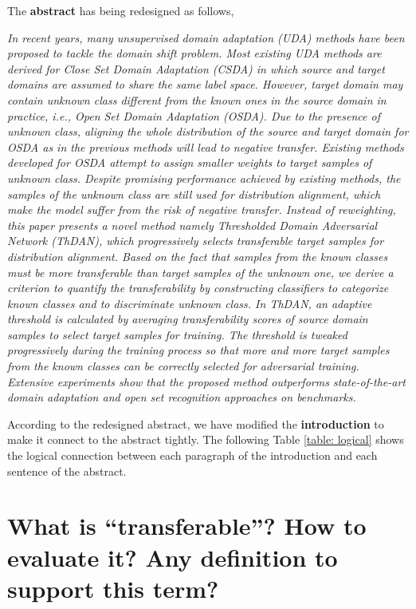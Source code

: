The \textbf{abstract} has being redesigned as follows,
\begin{siderules}
    \textit{
        \footnotesize
        In recent years, many unsupervised domain adaptation (UDA) methods have been proposed to tackle the domain shift problem.
        Most existing UDA methods are derived for Close Set Domain Adaptation (\textit{CSDA}) in which source and target domains are assumed to share the same label space.
        However, target domain may contain unknown class different from the known ones in the source domain in practice, i.e., Open Set Domain Adaptation (\textit{OSDA}).
        Due to the presence of unknown class, aligning the whole distribution of the source and target domain for OSDA as in the previous methods will lead to negative transfer.
        Existing methods developed for OSDA attempt to assign smaller weights to target samples of unknown class.
        Despite promising performance achieved by existing methods, the samples of the unknown class are still used for distribution alignment, which make the model suffer from the risk of negative transfer.
        Instead of reweighting, this paper presents a novel method namely Thresholded Domain Adversarial Network (\textit{ThDAN}), which progressively selects transferable target samples for distribution alignment.
        Based on the fact that samples from the known classes must be more transferable than target samples of the unknown one, we derive a criterion to quantify the transferability by constructing classifiers to categorize known classes and to discriminate unknown class.
        In ThDAN, an adaptive threshold is calculated by averaging transferability scores of source domain samples to select target samples for training.
        The threshold is tweaked progressively during the training process so that more and more target samples from the known classes can be correctly selected for adversarial training.
        Extensive experiments show that the proposed method outperforms state-of-the-art domain adaptation and open set recognition approaches on benchmarks.
    }
\end{siderules}

According to the redesigned abstract, we have modified the \textbf{introduction} to make it connect to the abstract tightly.
The following Table \ref{table: logical} shows the logical connection between each paragraph of the introduction and each sentence of the abstract.



\section{What is ``transferable''? How to evaluate it? Any definition to support this term?}
\label{question: transferable}
